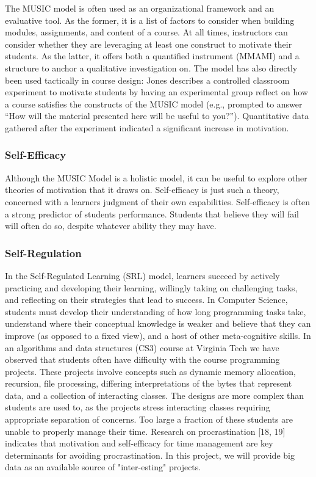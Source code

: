 The MUSIC model is often used as an organizational framework and an evaluative tool.
As the former, it is a list of factors to consider when building modules, assignments, and content of a course.
At all times, instructors can consider whether they are leveraging at least one construct to motivate their students.
As the latter, it offers both a quantified instrument (MMAMI) and a structure to anchor a qualitative investigation on.
The model has also directly been used tactically in course design: Jones describes a controlled classroom experiment to motivate students by having an experimental group reflect on how a course satisfies the constructs of the MUSIC model (e.g., prompted to answer ``How will the material presented here will be useful to you?'').
Quantitative data gathered after the experiment indicated a significant increase in motivation.~\cite{mcginley2014brief}

\subsubsection{Self-Efficacy}

Although the MUSIC Model is a holistic model, it can be useful to explore other theories of motivation that it draws on.
Self-efficacy is just such a theory, concerned with a learners judgment of their own capabilities.
Self-efficacy is often a strong predictor of students performance.
Students that believe they will fail will often do so, despite whatever ability they may have.

\subsubsection{Self-Regulation}
In the Self-Regulated Learning (SRL) model, learners succeed by actively practicing and developing their learning, willingly taking on challenging tasks, and reflecting on their strategies that lead to success.
In Computer Science, students must develop their understanding of how long programming tasks take, understand where their conceptual knowledge is weaker and believe that they can improve (as opposed to a fixed view), and a host of other meta-cognitive skills.
In an algorithms and data structures (CS3) course at Virginia Tech we have observed that students often have difficulty with the course programming projects.
These projects involve concepts such as dynamic memory allocation, recursion, file processing, differing interpretations of the bytes that represent data, and a collection of interacting classes.
The designs are more complex than students are used to, as the projects stress interacting classes requiring appropriate separation of concerns.
Too large a fraction of these students are unable to properly manage their time.
Research on procrastination [18, 19] indicates that motivation and self-efficacy for time management are key determinants for avoiding procrastination. In this project, we will provide big data as an available source of "inter-esting" projects.

